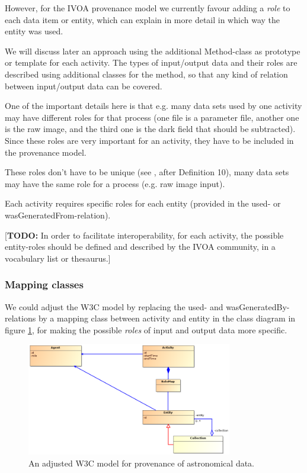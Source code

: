 \documentclass[11pt,a4paper]{ivoa}
\newcommand{\TODO}[1]{\noindent \textcolor{todocolor}{[\textbf{TODO:} #1]}}
\begin{document}
However, for the IVOA provenance model we currently favour adding a \emph{role} to each data item or entity, which can explain in more detail in which way the entity was used.

We will discuss later an approach using the additional Method-class as prototype or template for each activity.
The types of input/output data and their roles are described using additional classes for the method, so that any kind of relation between input/output data can be covered.

One of the important details here is that e.g. many data sets used by one activity may have different roles for that process (one file is a parameter file, another one is the raw image, and the third one is the dark field that should be subtracted). Since these roles are very important for an activity, they have to be included in the provenance model.

These roles don't have to be unique (see \cite{moreau2010}, after Definition 10), many data sets may have the same role for a process (e.g. raw image input).

Each activity requires specific roles for each entity (provided in the used- or wasGeneratedFrom-relation). 

\TODO{In order to facilitate interoperability, for each activity, the possible entity-roles should be defined and described by the IVOA community, in a vocabulary list or thesaurus.}


\subsubsection{Mapping classes}
We could adjust the W3C model by 
replacing the used- and wasGeneratedBy-relations by a mapping class between activity and entity in the class diagram in figure \ref{fig:classes-w3c-adjusted}, for making the possible \emph{roles} of input and output data more specific.

\begin{figure}
\centering
\includegraphics[width=0.8\textwidth]{ProvDM-W3C-adjusted.png}
\caption{An adjusted W3C model for provenance of astronomical data.}
\label{fig:classes-w3c-adjusted}
\end{figure}
\end{document}
